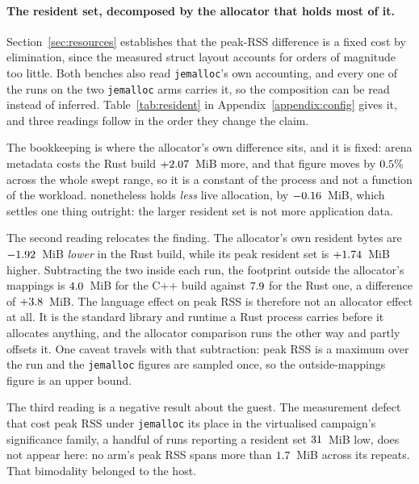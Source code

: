 \documentclass[english,oneside,a4paper,censored,csm,software-track-2020]{HYthesisML}
\begin{document}
\begin{appendices}
\paragraph{The resident set, decomposed by the allocator that holds most of it.}
Section~\ref{sec:resources} establishes that the peak-RSS difference is a fixed cost by
elimination, since the measured struct layout accounts for orders of magnitude too little. Both
benches also read \texttt{jemalloc}'s own accounting, and every one of the \BmJeRuns{} runs on the
two \texttt{jemalloc} arms carries it, so the composition can be read instead of inferred.
Table~\ref{tab:resident} in Appendix~\ref{appendix:config} gives it, and three readings follow in
the order they change the claim.

The bookkeeping is where the allocator's own difference sits, and it is fixed: arena metadata costs
the Rust build $+2.07$~MiB more, and that figure moves by $0.5\%$ across the
whole swept range, so it is a constant of the process and not a function of the workload.
\BmJeLiveLower{} nonetheless holds \emph{less} live allocation, by $-0.16$~MiB, which
settles one thing outright: the larger resident set is not more application data.

The second reading relocates the finding. The allocator's own resident bytes are
$-1.92$~MiB \emph{lower} in the Rust build, while its peak resident set is
$+1.74$~MiB higher. Subtracting the two inside each run, the footprint outside the
allocator's mappings is $4.0$~MiB for the C++ build against $7.9$ for the
Rust one, a difference of $+3.8$~MiB. The language effect on peak RSS is therefore not
an allocator effect at all. It is the standard library and runtime a Rust process carries before it
allocates anything, and the allocator comparison runs the other way and partly offsets it. One
caveat travels with that subtraction: peak RSS is a maximum over the run and the
\texttt{jemalloc} figures are sampled once, so the outside-mappings figure is an upper bound.

The third reading is a negative result about the guest. The measurement defect that cost peak RSS
under \texttt{jemalloc} its place in the virtualised campaign's significance family, a handful of
runs reporting a resident set $31$~MiB low, does not appear here: no arm's peak
RSS spans more than $1.7$~MiB across its repeats. That bimodality belonged to the host.


\end{appendices}
\end{document}
